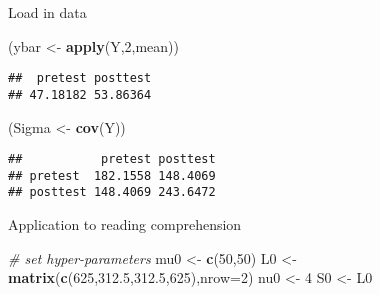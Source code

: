 \documentclass[ignorenonframetext,]{beamer}
\newenvironment{Shaded}{\begin{snugshade}}{\end{snugshade}}
\newcommand{\KeywordTok}[1]{\textcolor[rgb]{0.13,0.29,0.53}{\textbf{#1}}}
\newcommand{\DataTypeTok}[1]{\textcolor[rgb]{0.13,0.29,0.53}{#1}}
\newcommand{\DecValTok}[1]{\textcolor[rgb]{0.00,0.00,0.81}{#1}}
\newcommand{\FloatTok}[1]{\textcolor[rgb]{0.00,0.00,0.81}{#1}}
\newcommand{\StringTok}[1]{\textcolor[rgb]{0.31,0.60,0.02}{#1}}
\newcommand{\CommentTok}[1]{\textcolor[rgb]{0.56,0.35,0.01}{\textit{#1}}}
\newcommand{\NormalTok}[1]{#1}
\begin{document}
\begin{frame}[fragile]{Load in data}
\begin{Shaded}
\begin{Highlighting}[]
\NormalTok{(ybar <-}\StringTok{ }\KeywordTok{apply}\NormalTok{(Y,}\DecValTok{2}\NormalTok{,mean))}
\end{Highlighting}
\end{Shaded}

\begin{verbatim}
##  pretest posttest 
## 47.18182 53.86364
\end{verbatim}

\begin{Shaded}
\begin{Highlighting}[]
\NormalTok{(Sigma <-}\StringTok{ }\KeywordTok{cov}\NormalTok{(Y))}
\end{Highlighting}
\end{Shaded}

\begin{verbatim}
##           pretest posttest
## pretest  182.1558 148.4069
## posttest 148.4069 243.6472
\end{verbatim}

\end{frame}

\begin{frame}[fragile]{Application to reading comprehension}

\begin{Shaded}
\begin{Highlighting}[]
\CommentTok{# set hyper-parameters}
\NormalTok{mu0 <-}\StringTok{ }\KeywordTok{c}\NormalTok{(}\DecValTok{50}\NormalTok{,}\DecValTok{50}\NormalTok{)}
\NormalTok{L0 <-}\StringTok{ }\KeywordTok{matrix}\NormalTok{(}\KeywordTok{c}\NormalTok{(}\DecValTok{625}\NormalTok{,}\FloatTok{312.5}\NormalTok{,}\FloatTok{312.5}\NormalTok{,}\DecValTok{625}\NormalTok{),}\DataTypeTok{nrow=}\DecValTok{2}\NormalTok{)}
\NormalTok{nu0 <-}\StringTok{ }\DecValTok{4}
\NormalTok{S0 <-}\StringTok{ }\NormalTok{L0}
\end{Highlighting}
\end{Shaded}

\end{frame}
\end{document}
